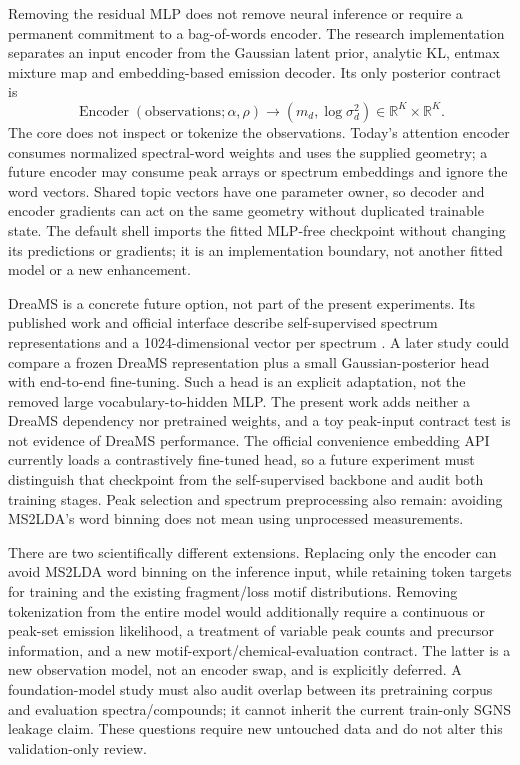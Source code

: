 \documentclass[10pt,a4paper]{article}
\begin{document}
Removing the residual MLP does not remove neural inference or require a
permanent commitment to a bag-of-words encoder. The research implementation
separates an input encoder from the Gaussian latent prior, analytic KL,
entmax mixture map and embedding-based emission decoder. Its only posterior
contract is
\begin{equation}
 \operatorname{Encoder}(\text{observations};\alpha,\rho)
       \longrightarrow (m_d,\log\sigma_d^2)\in\mathbb{R}^K\times\mathbb{R}^K.
 \label{eq:encoder-interface}
\end{equation}
The core does not inspect or tokenize the observations. Today's attention
encoder consumes normalized spectral-word weights and uses the supplied
geometry; a future encoder may consume peak arrays or spectrum embeddings
and ignore the word vectors. Shared topic vectors have one parameter owner,
so decoder and encoder gradients can act on the same geometry without
duplicated trainable state. The default shell imports the fitted MLP-free
checkpoint without changing its predictions or gradients; it is an
implementation boundary, not another fitted model or a new enhancement.

DreaMS is a concrete future option, not part of the present experiments.
Its published work and official interface describe self-supervised spectrum
representations and a 1024-dimensional vector per spectrum
\cite{bushuiev2025,dreamsdocs}. A later study could compare a frozen DreaMS
representation plus a small Gaussian-posterior head with end-to-end
fine-tuning. Such a head is an explicit adaptation, not the removed large
vocabulary-to-hidden MLP. The present work adds neither a DreaMS dependency
nor pretrained weights, and a toy peak-input contract test is not evidence
of DreaMS performance.
The official convenience embedding API currently loads a contrastively
fine-tuned head, so a future experiment must distinguish that checkpoint from
the self-supervised backbone and audit both training stages. Peak selection
and spectrum preprocessing also remain: avoiding MS2LDA's word binning does
not mean using unprocessed measurements.

There are two scientifically different extensions. Replacing only the encoder
can avoid MS2LDA word binning on the inference input, while retaining token
targets for training and the existing fragment/loss motif distributions.
Removing tokenization from the entire model would additionally require a
continuous or peak-set emission likelihood, a treatment of variable peak
counts and precursor information, and a new motif-export/chemical-evaluation
contract. The latter is a new observation model, not an encoder swap, and is
explicitly deferred. A foundation-model study must also audit overlap between
its pretraining corpus and evaluation spectra/compounds; it cannot inherit
the current train-only SGNS leakage claim. These questions require new
untouched data and do not alter this validation-only review.
\end{document}
